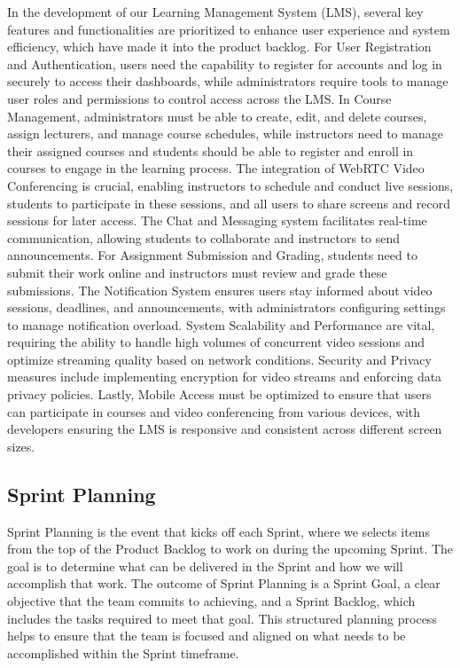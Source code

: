 \documentclass[a4paper,12pt]{article}  %
\begin{document}
In the development of our Learning Management System (LMS), several key
features and functionalities are prioritized to enhance user experience and
system efficiency, which have made it into the product backlog. For User
Registration and Authentication, users need the capability to register for
accounts and log in securely to access their dashboards, while administrators
require tools to manage user roles and permissions to control access across the
LMS. In Course Management, administrators must be able to create, edit, and
delete courses, assign lecturers, and manage course schedules, while
instructors need to manage their assigned courses and students should be able
to register and enroll in courses to engage in the learning process. The
integration of WebRTC Video Conferencing is crucial, enabling instructors to
schedule and conduct live sessions, students to participate in these sessions,
and all users to share screens and record sessions for later access. The Chat
and Messaging system facilitates real-time communication, allowing students to
collaborate and instructors to send announcements. For Assignment Submission
and Grading, students need to submit their work online and instructors must
review and grade these submissions. The Notification System ensures users stay
informed about video sessions, deadlines, and announcements, with
administrators configuring settings to manage notification overload. System
Scalability and Performance are vital, requiring the ability to handle high
volumes of concurrent video sessions and optimize streaming quality based on
network conditions. Security and Privacy measures include implementing
encryption for video streams and enforcing data privacy policies. Lastly,
Mobile Access must be optimized to ensure that users can participate in courses
and video conferencing from various devices, with developers ensuring the LMS
is responsive and consistent across different screen sizes.\\

\subsection{Sprint Planning}
Sprint Planning is the event that kicks off each Sprint, where we selects items from the top of the Product Backlog to work on during the upcoming Sprint. The goal is to determine what can be delivered in the Sprint and how we will accomplish that work. The outcome of Sprint Planning is a Sprint Goal, a clear objective that the team commits to achieving, and a Sprint Backlog, which includes the tasks required to meet that goal. This structured planning process helps to ensure that the team is focused and aligned on what needs to be accomplished within the Sprint timeframe.\cite{beck2001agile}\cite{beedle2001agile}\cite{schwaber2020scrum}\\
\end{document}
